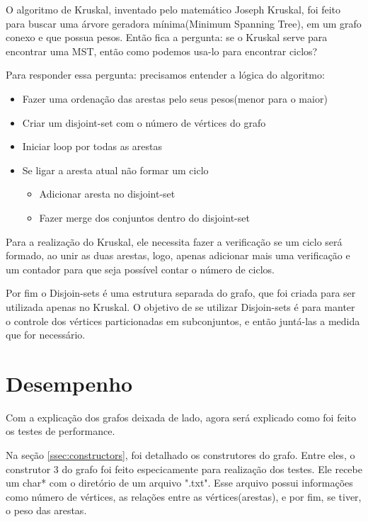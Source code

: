 \documentclass[12pt]{article}
\begin{document}
  O algoritmo de Kruskal, inventado pelo matemático Joseph Kruskal, foi feito para buscar 
  uma árvore geradora mínima(Minimum Spanning Tree), em um grafo conexo e que possua pesos. 
  Então fica a pergunta: se o Kruskal serve para encontrar uma MST, então como podemos usa-lo 
  para encontrar ciclos? 

  Para responder essa pergunta: precisamos entender a lógica do algoritmo:

  \begin{itemize}
    \item Fazer uma ordenação das arestas pelo seus pesos(menor para o maior)
    \item Criar um disjoint-set com o número de vértices do grafo 
    \item Iniciar loop por todas as arestas
    \item Se ligar a aresta atual não formar um ciclo
    
    \begin{itemize}
      \item Adicionar aresta no disjoint-set 
      \item Fazer merge dos conjuntos dentro do disjoint-set
    \end{itemize}
  \end{itemize}

  Para a realização do Kruskal, ele necessita fazer a verificação se um ciclo será formado,
  ao unir as duas arestas, logo, apenas adicionar mais uma verificação e um contador para 
  que seja possível contar o número de ciclos.

  Por fim o Disjoin-sets é uma estrutura separada do grafo, que foi criada para ser utilizada
  apenas no Kruskal. O objetivo de se utilizar Disjoin-sets é para manter o controle dos vértices 
  particionadas em subconjuntos, e então juntá-las a medida que for necessário.

  \section{Desempenho} \label{sec:performance}

  Com a explicação dos grafos deixada de lado, agora será explicado como foi feito os testes de performance.

  Na seção \ref{ssec:constructors}, foi detalhado os construtores do grafo. Entre eles,
  o construtor 3 do grafo foi feito especicamente para realização dos testes. Ele 
  recebe um char* com o diretório de um arquivo ".txt". Esse arquivo possui informações como número de 
  vértices, as relações entre as vértices(arestas), e por fim, se tiver, o peso das arestas.
\end{document}
